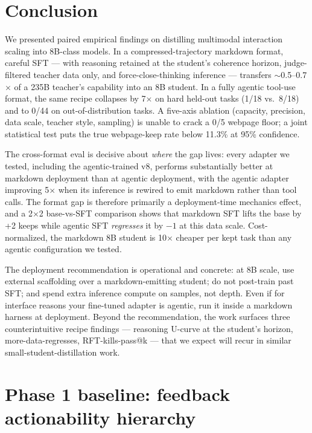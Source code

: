 \documentclass[11pt]{article}
\begin{document}
\section{Conclusion}
\label{sec:conclusion}

We presented paired empirical findings on distilling multimodal interaction scaling into 8B-class models. In a compressed-trajectory markdown format, careful SFT --- with reasoning retained at the student's coherence horizon, judge-filtered teacher data only, and force-close-thinking inference --- transfers $\sim$0.5--0.7$\times$ of a 235B teacher's capability into an 8B student. In a fully agentic tool-use format, the same recipe collapses by 7$\times$ on hard held-out tasks (1/18 vs.\ 8/18) and to 0/44 on out-of-distribution tasks. A five-axis ablation (capacity, precision, data scale, teacher style, sampling) is unable to crack a 0/5 webpage floor; a joint statistical test puts the true webpage-keep rate below 11.3\% at 95\% confidence.

The cross-format eval is decisive about \emph{where} the gap lives: every adapter we tested, including the agentic-trained v8, performs substantially better at markdown deployment than at agentic deployment, with the agentic adapter improving 5$\times$ when its inference is rewired to emit markdown rather than tool calls. The format gap is therefore primarily a deployment-time mechanics effect, and a 2$\times$2 base-vs-SFT comparison shows that markdown SFT lifts the base by +2 keeps while agentic SFT \emph{regresses} it by $-1$ at this data scale. Cost-normalized, the markdown 8B student is 10$\times$ cheaper per kept task than any agentic configuration we tested.

The deployment recommendation is operational and concrete: at 8B scale, use external scaffolding over a markdown-emitting student; do not post-train past SFT; and spend extra inference compute on samples, not depth. Even if for interface reasons your fine-tuned adapter is agentic, run it inside a markdown harness at deployment. Beyond the recommendation, the work surfaces three counterintuitive recipe findings --- reasoning U-curve at the student's horizon, more-data-regresses, RFT-kills-pass@k --- that we expect will recur in similar small-student-distillation work.




\appendix

\section{Phase 1 baseline: feedback actionability hierarchy}
\label{app:phase1}
\end{document}
